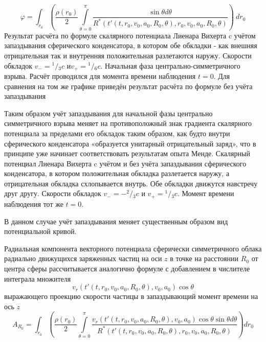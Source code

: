 ﻿\documentclass{article}
\begin{document}
	\[\varphi =\int_{{{r}_{0}}}{\left( \frac{\rho \left( {{r}_{0}} \right)}{2}\int\limits_{\theta =0}^{\pi }{\frac{\sin \theta d\theta }{{{R}^{*}}\left( t'\left( t,{{r}_{0}},{{v}_{0}},{{a}_{0}},{{R}_{0}},\theta  \right),{{r}_{0}},{{v}_{0}},{{a}_{0}},{{R}_{0}},\theta  \right)}} \right)}\ d{{r}_{0}}\] 	
Результат расчёта по формуле  скалярного потенциала Лиенара Вихерта c учётом запаздывания сферического конденсатора, в котором обе обкладки - как внешняя отрицательная  так и внутренняя положительная разлетаются наружу. Скорости обкладок ${{v}_{-}}={}^{1}/{}_{3}c$ и${{v}_{+}}={}^{1}/{}_{6}c$. Начальная фаза центрально-симметричного взрыва. Расчёт проводился для момента времени наблюдения $t=0$. Для сравнения на том же графике приведён результат расчёта по формуле  без учёта запаздывания

Таким образом учёт запаздывания для начальной фазы центрально симметричного взрыва меняет на противоположный знак градиента скалярного потенциала за пределами его обкладок таким образом, как будто внутри сферического конденсатора «образуется унитарный отрицательный заряд», что в принципе уже начинает соответствовать результатам опыта Менде.
Скалярный потенциал Лиенара Вихерта c учётом и без учёта запаздывания сферического конденсатора, в котором положительная обкладка разлетается наружу, а отрицательная обкладка схлопывается внутрь. Обе обкладки движутся навстречу друг другу. Скорости обкладок ${{v}_{-}}=-{}^{2}/{}_{3}c$ и ${{v}_{+}}={}^{1}/{}_{3}c$. Момент времени наблюдения тот же $t=0$.

В данном случае учёт запаздывания меняет существенным образом вид потенциальной кривой.

Радиальная компонента векторного потенциала сферически симметричного облака радиально движущихся заряженных частиц на оси $z$ в точке на расстоянии ${{R}_{0}}$ от центра сферы рассчитывается аналогично формуле  с добавлением в числителе интеграла множителя \[{{v}_{r}}\left( t'\left( t,{{r}_{0}},{{v}_{0}},{{a}_{0}},{{R}_{0}},\theta  \right),{{v}_{0}},{{a}_{0}} \right)\cos \theta \] выражающего проекцию скорости частицы в запаздывающий момент времени на ось $z$ 
	\[{{A}_{{{R}_{0}}}}=\int_{{{r}_{0}}}{\left( \frac{\rho \left( {{r}_{0}} \right)}{2}\int\limits_{\theta =0}^{\pi }{\frac{{{v}_{r}}\left( t'\left( t,{{r}_{0}},{{v}_{0}},{{a}_{0}},{{R}_{0}},\theta  \right),{{v}_{0}},{{a}_{0}} \right)\cos \theta \sin \theta d\theta }{{{R}^{*}}\left( t'\left( t,{{r}_{0}},{{v}_{0}},{{a}_{0}},{{R}_{0}},\theta  \right),{{r}_{0}},{{v}_{0}},{{a}_{0}},{{R}_{0}},\theta  \right)}} \right)}d{{r}_{0}}\] 	
\end{document}
